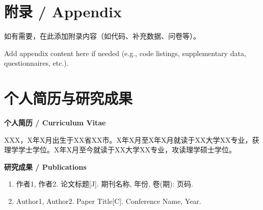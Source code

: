 \documentclass[a4paper,12pt,openright]{ctexrep}
\begin{document}
\appendix
\chapter{附录 / Appendix}
如有需要，在此添加附录内容（如代码、补充数据、问卷等）。

Add appendix content here if needed (e.g., code listings, supplementary data, questionnaires, etc.).


\chapter*{个人简历与研究成果}

\noindent\textbf{个人简历 / Curriculum Vitae}

\noindent XXX，X年X月出生于XX省XX市。X年X月至X年X月就读于XX大学XX专业，获理学学士学位。X年X月至今就读于XX大学XX专业，攻读理学硕士学位。

\vspace{0.5cm}
\noindent\textbf{研究成果 / Publications}

\begin{enumerate}
\item 作者1, 作者2. 论文标题[J]. 期刊名称, 年份, 卷(期): 页码.
\item Author1, Author2. Paper Title[C]. Conference Name, Year.
\end{enumerate}
\end{document}
